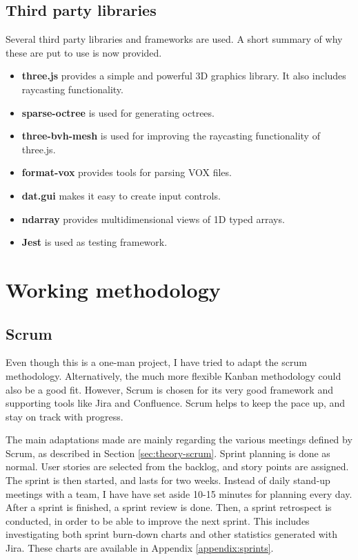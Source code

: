 \subsection{Third party libraries}
Several third party libraries and frameworks are used. A short summary of why these are put to use is now provided.
\begin{itemize}
    \item \textbf{three.js} provides a simple and powerful 3D graphics library. It also includes raycasting functionality.
    \item \textbf{sparse-octree} is used for generating octrees.
    \item \textbf{three-bvh-mesh} is used for improving the raycasting functionality of three.js.
    \item \textbf{format-vox} provides tools for parsing VOX files.
    \item \textbf{dat.gui} makes it easy to create input controls.
    \item \textbf{ndarray} provides multidimensional views of 1D typed arrays.
    \item \textbf{Jest} is used as testing framework.
\end{itemize}

\section{Working methodology}
\subsection{Scrum}
\label{sec:method-scrum}
Even though this is a one-man project, I have tried to adapt the scrum methodology. Alternatively, the much more flexible Kanban methodology could also be a good fit. However, Scrum is chosen for its very good framework and supporting tools like Jira and Confluence. Scrum helps to keep the pace up, and stay on track with progress.

The main adaptations made are mainly regarding the various meetings defined by Scrum, as described in Section \ref{sec:theory-scrum}. Sprint planning is done as normal. User stories are selected from the backlog, and story points are assigned. The sprint is then started, and lasts for two weeks. Instead of daily stand-up meetings with a team, I have have set aside 10-15 minutes for planning every day. After a sprint is finished, a sprint review is done. Then, a sprint retrospect is conducted, in order to be able to improve the next sprint. This includes investigating both sprint burn-down charts and other statistics generated with Jira. These charts are available in Appendix \ref{appendix:sprints}.

